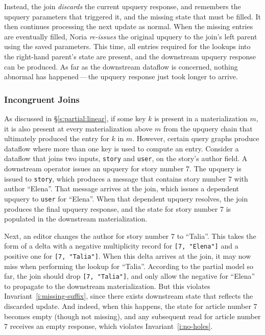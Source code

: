 Instead, the join \emph{discards} the current upquery response, and remembers
the upquery parameters that triggered it, and the missing state that must be
filled. It then continues processing the next update as normal. When the missing
entries are eventually filled, Noria \emph{re-issues} the original upquery to
the join's left parent using the saved parameters. This time, all entries
required for the lookups into the right-hand parent's state are present, and the
downstream upquery response can be produced. As far as the downstream dataflow
is concerned, nothing abnormal has happened\,---\,the upquery response just took
longer to arrive.

\subsubsection{Incongruent Joins}
\label{join-evictions}

As discussed in \S\ref{s:partial:linear}, if some key $k$ is present in a
materialization $m$, it is also present at every materialization above $m$ from
the upquery chain that ultimately produced the entry for $k$ in $m$. However,
certain query graphs produce dataflow where more than one key is used to compute
an entry. Consider a dataflow that joins two inputs, \texttt{story} and
\texttt{user}, on the story's author field. A downstream operator issues an
upquery for story number 7. The upquery is issued to \texttt{story}, which
produces a message that contains story number 7 with author ``Elena''. That
message arrives at the join, which issues a dependent upquery to \texttt{user}
for ``Elena''. When that dependent upquery resolves, the join produces the final
upquery response, and the state for story number 7 is populated in the
downstream materialization.

Next, an editor changes the author for story number 7 to ``Talia''. This
takes the form of a delta with a negative multiplicity record for \texttt{[7,
"Elena"]} and a positive one for \texttt{[7, "Talia"]}. When this delta arrives
at the join, it may now miss when performing the lookup for ``Talia''. According
to the partial model so far, the join should drop \texttt{[7, "Talia"]}, and
only allow the negative for ``Elena'' to propagate to the downstream
materialization. But this violates Invariant~\ref{i:missing-suffix}, since there
exists downstream state that reflects the discarded update. And indeed, when
this happens, the state for article number 7 becomes empty (though not missing),
and any subsequent read for article number 7 receives an empty response, which
violates Invariant~\ref{i:no-holes}.

